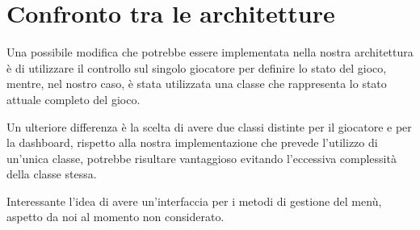 \documentclass[12pt]{article}
\begin{document}
\section{Confronto tra le architetture}

Una possibile modifica che potrebbe essere implementata nella nostra architettura è di utilizzare il controllo sul singolo giocatore per definire lo stato del gioco, mentre, nel nostro caso, è stata utilizzata una classe che rappresenta lo stato attuale completo del gioco.

Un ulteriore differenza è la scelta di avere due classi distinte per il giocatore e per la dashboard, rispetto alla nostra implementazione che prevede l'utilizzo di un'unica classe, potrebbe risultare vantaggioso evitando l'eccessiva complessità della classe stessa.

Interessante l'idea di avere un'interfaccia per i metodi di gestione del menù, aspetto da noi al momento non considerato.
\end{document}
